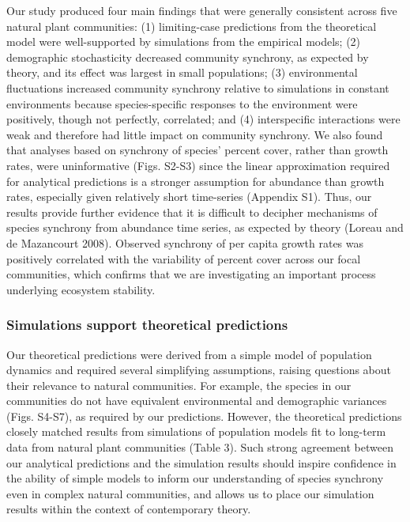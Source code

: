 \documentclass[12pt,]{article}
\begin{document}
Our study produced four main findings that were generally consistent
across five natural plant communities: (1) limiting-case predictions
from the theoretical model were well-supported by simulations from the
empirical models; (2) demographic stochasticity decreased community
synchrony, as expected by theory, and its effect was largest in small
populations; (3) environmental fluctuations increased community
synchrony relative to simulations in constant environments because
species-specific responses to the environment were positively, though
not perfectly, correlated; and (4) interspecific interactions were weak
and therefore had little impact on community synchrony. We also found
that analyses based on synchrony of species' percent cover, rather than
growth rates, were uninformative (Figs. S2-S3) since the linear
approximation required for analytical predictions is a stronger
assumption for abundance than growth rates, especially given relatively
short time-series (Appendix S1). Thus, our results provide further
evidence that it is difficult to decipher mechanisms of species
synchrony from abundance time series, as expected by theory (Loreau and
{{de Mazancourt}} 2008). Observed synchrony of per capita growth rates
was positively correlated with the variability of percent cover across
our focal communities, which confirms that we are investigating an
important process underlying ecosystem stability.

\subsubsection{Simulations support theoretical
predictions}\label{simulations-support-theoretical-predictions}

Our theoretical predictions were derived from a simple model of
population dynamics and required several simplifying assumptions,
raising questions about their relevance to natural communities. For
example, the species in our communities do not have equivalent
environmental and demographic variances (Figs. S4-S7), as required by
our predictions. However, the theoretical predictions closely matched
results from simulations of population models fit to long-term data from
natural plant communities (Table 3). Such strong agreement between our
analytical predictions and the simulation results should inspire
confidence in the ability of simple models to inform our understanding
of species synchrony even in complex natural communities, and allows us
to place our simulation results within the context of contemporary
theory.
\end{document}
